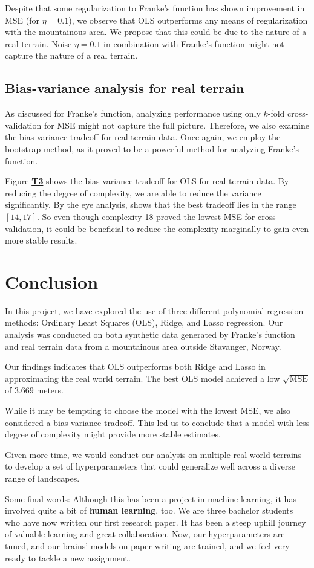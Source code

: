 \documentclass{article}
\begin{document}
\begin{multicols}{2}
Despite that some regularization to Franke's function has shown improvement in MSE (for $\eta = 0.1$), we observe that OLS outperforms any means of regularization with the mountainous area. We propose that this could be due to the nature of a real terrain. Noise $\eta = 0.1$ in combination with Franke's function might not capture the nature of a real terrain. 

\subsection*{Bias-variance analysis for real terrain}
As discussed for Franke's function, analyzing performance using only $k$-fold cross-validation for MSE might not capture the full picture. Therefore, we also examine the bias-variance tradeoff for real terrain data. Once again, we employ the bootstrap method, as it proved to be a powerful method for analyzing Franke's function.

Figure \hyperref[fig:T3]{\textbf{T3}} shows the bias-variance tradeoff for OLS for real-terrain data.
By reducing the degree of complexity, we are able to reduce the variance significantly. By the eye analysis, shows that the best tradeoff lies in the range $[14, 17]$. So even though complexity 18 proved the lowest MSE for cross validation, it could be beneficial to reduce the complexity marginally to gain even more stable results. 

\section*{Conclusion}
In this project, we have explored the use of three different polynomial regression methods: Ordinary Least Squares (OLS), Ridge, and Lasso regression. Our analysis was conducted on both synthetic data generated by Franke’s function and real terrain data from a mountainous area outside Stavanger, Norway.

Our findings indicates that OLS outperforms both Ridge and Lasso in approximating the real world terrain. The best OLS model achieved a low $\sqrt{\text{MSE}}$ of $3.669$ meters.

While it may be tempting to choose the model with the lowest MSE, we also considered a bias-variance tradeoff. This led us to conclude that a model with less degree of complexity might provide more stable estimates. 

Given more time, we would conduct our analysis on multiple real-world terrains to develop a set of hyperparameters that could generalize well across a diverse range of landscapes.

Some final words: Although this has been a project in machine learning, it has involved quite a bit of \textbf{human learning}, too. We are three bachelor students who have now written our first research paper. It has been a steep uphill journey of valuable learning and great collaboration. Now, our hyperparameters are tuned, and our brains’ models on paper-writing are trained, and we feel very ready to tackle a new assignment.
\end{multicols}
\end{document}

